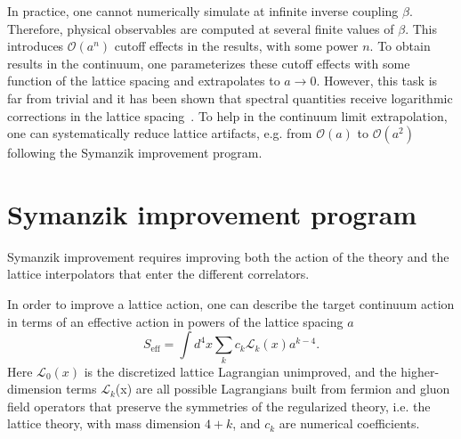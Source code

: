 In practice, one cannot numerically simulate at infinite inverse coupling $\beta$. Therefore, physical observables are computed at several finite values of $\beta$. This introduces $\mathcal{O}(a^n)$ cutoff effects in the results, with some power $n$. To obtain results in the continuum, one parameterizes these cutoff effects with some function of the lattice spacing and extrapolates to $a\rightarrow 0$. However, this task is far from trivial and it has been shown that spectral quantities receive logarithmic corrections in the lattice spacing~\citep{Husung:2022kvi}. To help in the continuum limit extrapolation, one can systematically reduce lattice artifacts, e.g. from $\mathcal{O}(a)$ to $\mathcal{O}(a^2)$ following the Symanzik improvement program. 


\section{Symanzik improvement program}
\label{ch_foundation:sec:impr}

Symanzik improvement requires improving both the action of the theory and the lattice interpolators that enter the different correlators. 

In order to improve a lattice action, one can describe the target continuum action in terms of an effective action in powers of the lattice spacing $a$
\begin{equation}
S_{\textrm{eff}}=\int d^4x\sum_kc_k\mathcal{L}_k(x)a^{k-4}.
\end{equation}
Here $\mathcal{L}_0(x)$ is the discretized lattice Lagrangian unimproved, and the higher-dimension terms $\mathcal{L}_k$(x) are all possible Lagrangians built from fermion and gluon field operators that preserve the symmetries of the regularized theory, i.e. the lattice theory, with mass dimension $4+k$, and $c_k$ are numerical coefficients.

